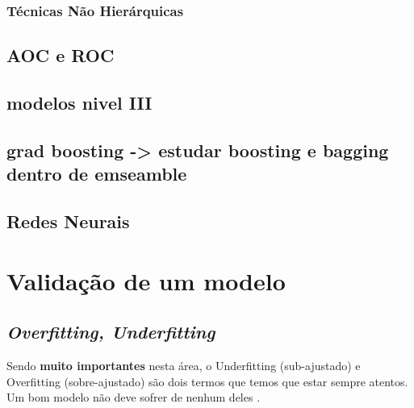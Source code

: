 \documentclass[
]{book}
\begin{document}
\hypertarget{tuxe9cnicas-nuxe3o-hieruxe1rquicas}{%
\subsection{Técnicas Não Hierárquicas}\label{tuxe9cnicas-nuxe3o-hieruxe1rquicas}}

\hypertarget{aoc-e-roc}{%
\section{AOC e ROC}\label{aoc-e-roc}}

\hypertarget{modelos-nivel-iii}{%
\section{modelos nivel III}\label{modelos-nivel-iii}}

\hypertarget{grad-boosting---estudar-boosting-e-bagging-dentro-de-emseamble}{%
\section{grad boosting -\textgreater{} estudar boosting e bagging dentro de emseamble}\label{grad-boosting---estudar-boosting-e-bagging-dentro-de-emseamble}}

\hypertarget{redes-neurais}{%
\section{Redes Neurais}\label{redes-neurais}}

\hypertarget{validauxe7uxe3o-de-um-modelo}{%
\chapter{Validação de um modelo}\label{validauxe7uxe3o-de-um-modelo}}

\hypertarget{overfitting-underfitting}{%
\section{\texorpdfstring{\emph{Overfitting, Underfitting}}{Overfitting, Underfitting}}\label{overfitting-underfitting}}

Sendo \textbf{muito importantes} nesta área, o Underfitting (sub-ajustado) e Overfitting (sobre-ajustado) são dois termos que temos que estar sempre atentos. Um bom modelo não deve sofrer de nenhum deles \citep{silver2013sinal}.
\end{document}
